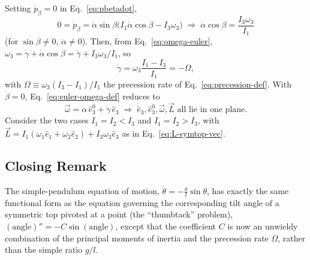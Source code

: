 \documentclass[11pt]{article}
\newcommand{\Om}{\Omega}
\begin{document}
Setting $\dot p_\beta=0$ in Eq.~\eqref{eq:pbetadot},
\begin{equation}
0 = \dot p_\beta = \dot\alpha\sin\beta\big(I_1\dot\alpha\cos\beta-I_3\omega_3\big) \;\Rightarrow\; \dot\alpha\cos\beta = \frac{I_3\omega_3}{I_1}
\label{eq:alpha-cosbeta}
\end{equation}
(for $\sin\beta\neq0$, $\dot\alpha\neq0$). Then, from Eq.~\eqref{eq:omega-euler}, $\omega_3=\dot\gamma+\dot\alpha\cos\beta=\dot\gamma+I_3\omega_3/I_1$, so
\begin{equation}
\boxed{\dot\gamma = \omega_3\frac{I_1-I_3}{I_1} = -\Om,}
\label{eq:gammadot-Omega}
\end{equation}
with $\Om\equiv\omega_3(I_3-I_1)/I_1$ the precession rate of Eq.~\eqref{eq:precession-def}. With $\dot\beta=0$, Eq.~\eqref{eq:euler-omega-def} reduces to
\begin{equation}
\vec\omega = \dot\alpha\,\hat e_3^0+\dot\gamma\,\hat e_3 \;\Rightarrow\; \hat e_3,\hat e_3^0,\vec\omega,\vec L \text{ all lie in one plane.}
\label{eq:one-plane}
\end{equation}
Consider the two cases $I_1=I_2<I_3$ and $I_1=I_2>I_3$, with $\vec L=I_1(\omega_1\hat e_1+\omega_2\hat e_2)+I_3\omega_3\hat e_3$ as in Eq.~\eqref{eq:L-symtop-vec}.

\subsection*{Closing Remark}

The simple-pendulum equation of motion, $\ddot\theta=-\frac{g}{l}\sin\theta$, has exactly the same functional form as the equation governing the corresponding tilt angle of a symmetric top pivoted at a point (the ``thumbtack'' problem), $(\text{angle})''=-C\sin(\text{angle})$, except that the coefficient $C$ is now an unwieldy combination of the principal moments of inertia and the precession rate $\Om$, rather than the simple ratio $g/l$.
\end{document}
